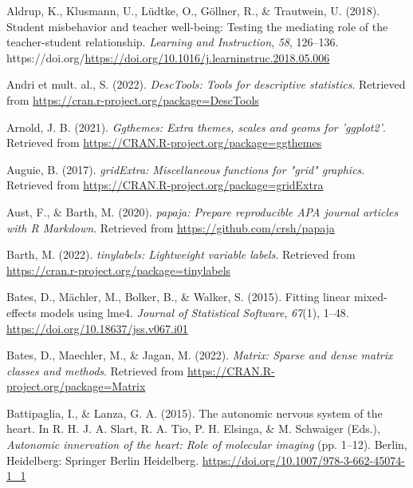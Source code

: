 \documentclass[
  man,floatsintext]{apa6}
\newlength{\cslhangindent}
\newlength{\cslentryspacingunit} %
\newenvironment{CSLReferences}[2] %
 {%
  \setlength{\parindent}{0pt}
  \ifodd #1
  \let\oldpar\par
  \def\par{\hangindent=\cslhangindent\oldpar}
  \fi
  \setlength{\parskip}{#2\cslentryspacingunit}
 }%
 {}
\begin{document}
\hypertarget{refs}{}
\begin{CSLReferences}{1}{0}
\leavevmode{}%
Aldrup, K., Klusmann, U., Lüdtke, O., Göllner, R., \& Trautwein, U. (2018). Student misbehavior and teacher well-being: Testing the mediating role of the teacher-student relationship. \emph{Learning and Instruction}, \emph{58}, 126--136. https://doi.org/\url{https://doi.org/10.1016/j.learninstruc.2018.05.006}

\leavevmode{}%
Andri et mult. al., S. (2022). \emph{{DescTools}: Tools for descriptive statistics}. Retrieved from \url{https://cran.r-project.org/package=DescTools}

\leavevmode{}%
Arnold, J. B. (2021). \emph{Ggthemes: Extra themes, scales and geoms for 'ggplot2'}. Retrieved from \url{https://CRAN.R-project.org/package=ggthemes}

\leavevmode{}%
Auguie, B. (2017). \emph{gridExtra: Miscellaneous functions for "grid" graphics}. Retrieved from \url{https://CRAN.R-project.org/package=gridExtra}

\leavevmode{}%
Aust, F., \& Barth, M. (2020). \emph{{papaja}: {Prepare} reproducible {APA} journal articles with {R Markdown}}. Retrieved from \url{https://github.com/crsh/papaja}

\leavevmode{}%
Barth, M. (2022). \emph{{tinylabels}: Lightweight variable labels}. Retrieved from \url{https://cran.r-project.org/package=tinylabels}

\leavevmode{}%
Bates, D., Mächler, M., Bolker, B., \& Walker, S. (2015). Fitting linear mixed-effects models using {lme4}. \emph{Journal of Statistical Software}, \emph{67}(1), 1--48. \url{https://doi.org/10.18637/jss.v067.i01}

\leavevmode{}%
Bates, D., Maechler, M., \& Jagan, M. (2022). \emph{Matrix: Sparse and dense matrix classes and methods}. Retrieved from \url{https://CRAN.R-project.org/package=Matrix}

\leavevmode{}%
Battipaglia, I., \& Lanza, G. A. (2015). The autonomic nervous system of the heart. In R. H. J. A. Slart, R. A. Tio, P. H. Elsinga, \& M. Schwaiger (Eds.), \emph{Autonomic innervation of the heart: Role of molecular imaging} (pp. 1--12). Berlin, Heidelberg: Springer Berlin Heidelberg. \url{https://doi.org/10.1007/978-3-662-45074-1_1}


\end{CSLReferences}
\end{document}
